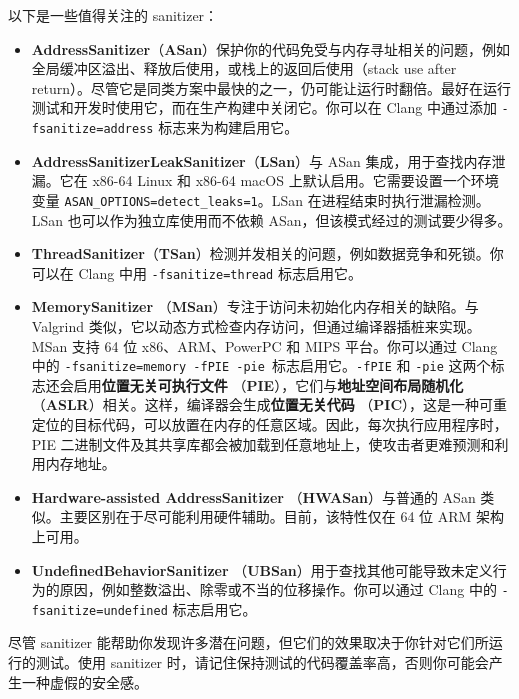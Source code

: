 以下是一些值得关注的 sanitizer：

\begin{itemize}
\label{idx:1102}
\item \textbf{AddressSanitizer}（\textbf{ASan}）保护你的代码免受与内存寻址相关的问题，例如全局缓冲区溢出、释放后使用，或栈上的返回后使用（stack use after return）。尽管它是同类方案中最快的之一，仍可能让运行时翻倍。最好在运行测试和开发时使用它，而在生产构建中关闭它。你可以在 Clang 中通过添加 \texttt{-fsanitize=\allowbreak{}address} 标志来为构建启用它。
\label{idx:1103}
\item \textbf{AddressSanitizerLeakSanitizer}（\textbf{LSan}）与 ASan 集成，用于查找内存泄漏。它在 x86-64 Linux 和 x86-64 macOS 上默认启用。它需要设置一个环境变量 \texttt{ASAN\_\allowbreak{}OPTIONS=\allowbreak{}detect\_\allowbreak{}leaks=\allowbreak{}1}。LSan 在进程结束时执行泄漏检测。LSan 也可以作为独立库使用而不依赖 ASan，但该模式经过的测试要少得多。
\label{idx:1104}
\item \textbf{ThreadSanitizer}（\textbf{TSan}）检测并发相关的问题，例如数据竞争和死锁。你可以在 Clang 中用 \texttt{-fsanitize=\allowbreak{}thread} 标志启用它。
\label{idx:1105}
\label{idx:1106}
\label{idx:1107}
\label{idx:1108}
\label{idx:1109}
\label{idx:1110}
\item \textbf{MemorySanitizer }（\textbf{MSan}）专注于访问未初始化内存相关的缺陷。与 Valgrind 类似，它以动态方式检查内存访问，但通过编译器插桩来实现。MSan 支持 64 位 x86、ARM、PowerPC 和 MIPS 平台。你可以通过 Clang 中的 \texttt{-fsanitize=\allowbreak{}memory -f\allowbreak{}PIE -pie }标志启用它。\texttt{-fPIE} 和 \texttt{-pie} 这两个标志还会启用\textbf{位置无关可执行文件 }（\textbf{PIE}），它们与\textbf{地址空间布局随机化 }（\textbf{ASLR}）相关。这样，编译器会生成\textbf{位置无关代码 }（\textbf{PIC}），这是一种可重定位的目标代码，可以放置在内存的任意区域。因此，每次执行应用程序时，PIE 二进制文件及其共享库都会被加载到任意地址上，使攻击者更难预测和利用内存地址。
\label{idx:1111}
\item \textbf{Hardware-assisted AddressSanitizer }（\textbf{HWASan}）与普通的 ASan 类似。主要区别在于尽可能利用硬件辅助。目前，该特性仅在 64 位 ARM 架构上可用。
\label{idx:1112}
\item \textbf{UndefinedBehaviorSanitizer }（\textbf{UBSan}）用于查找其他可能导致未定义行为的原因，例如整数溢出、除零或不当的位移操作。你可以通过 Clang 中的 \texttt{-fsanitize=\allowbreak{}undefined} 标志启用它。
\end{itemize}

尽管 sanitizer 能帮助你发现许多潜在问题，但它们的效果取决于你针对它们所运行的测试。使用 sanitizer 时，请记住保持测试的代码覆盖率高，否则你可能会产生一种虚假的安全感。


